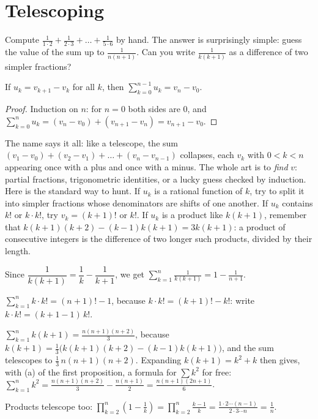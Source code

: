 \section{Telescoping}

\begin{think}
Compute $\frac1{1\cdot2}+\frac1{2\cdot3}+\dots+\frac1{5\cdot6}$ by hand. The answer is surprisingly simple: guess the value of the sum up to $\frac1{n(n+1)}$. Can you write $\frac1{k(k+1)}$ as a difference of two simpler fractions?
\end{think}

\begin{proposition}\label{prop:telescope}
If $u_k=v_{k+1}-v_k$ for all $k$, then $\displaystyle\sum_{k=0}^{n-1}u_k=v_n-v_0$.
\end{proposition}
\begin{proof}
Induction on $n$: for $n=0$ both sides are $0$, and $\sum_{k=0}^{n}u_k=(v_n-v_0)+(v_{n+1}-v_n)=v_{n+1}-v_0$.
\end{proof}

The name says it all: like a telescope, the sum $(v_1-v_0)+(v_2-v_1)+\dots+(v_n-v_{n-1})$ collapses, each $v_k$ with $0<k<n$ appearing once with a plus
and once with a minus. The whole art is to \emph{find} $v$: partial fractions, trigonometric identities, or a lucky guess checked by induction. Here is
the standard way to hunt. If $u_k$ is a rational function of $k$, try to split it into simpler fractions whose denominators are shifts of one
another. If $u_k$ contains $k!$ or $k\cdot k!$, try $v_k=(k+1)!$ or $k!$. If $u_k$ is a product like $k(k+1)$, remember that $k(k+1)(k+2)-(k-1)k(k+1)=3k(k+1)$:
a product of consecutive integers is the difference of two longer such products, divided by their length.

\begin{example}
Since $\dfrac{1}{k(k+1)}=\dfrac1k-\dfrac1{k+1}$, we get $\displaystyle\sum_{k=1}^n\frac1{k(k+1)}=1-\frac1{n+1}$.
\end{example}

\begin{examplex}
$\sum_{k=1}^nk\cdot k!=(n+1)!-1$, because $k\cdot k!=(k+1)!-k!$: write $k\cdot k!=(k+1-1)\,k!$.

$\sum_{k=1}^nk(k+1)=\frac{n(n+1)(n+2)}3$, because $k(k+1)=\frac13\bigl(k(k+1)(k+2)-(k-1)k(k+1)\bigr)$, and the sum telescopes to
$\frac13\,n(n+1)(n+2)$. Expanding $k(k+1)=k^2+k$ then gives, with (a) of the first proposition, a formula for $\sum k^2$ for free:
$\sum_{k=1}^nk^2=\frac{n(n+1)(n+2)}3-\frac{n(n+1)}2=\frac{n(n+1)(2n+1)}6$.

Products telescope too: $\prod_{k=2}^n\left(1-\frac1k\right)=\prod_{k=2}^n\frac{k-1}k=\frac{1\cdot2\cdots(n-1)}{2\cdot3\cdots n}=\frac1n$.
\end{examplex}

